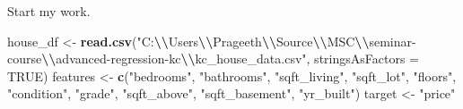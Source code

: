 \documentclass[
  ignorenonframetext,
]{beamer}
\newenvironment{Shaded}{\begin{snugshade}}{\end{snugshade}}
\newcommand{\AttributeTok}[1]{\textcolor[rgb]{0.13,0.29,0.53}{#1}}
\newcommand{\ConstantTok}[1]{\textcolor[rgb]{0.56,0.35,0.01}{#1}}
\newcommand{\FunctionTok}[1]{\textcolor[rgb]{0.13,0.29,0.53}{\textbf{#1}}}
\newcommand{\NormalTok}[1]{#1}
\newcommand{\OtherTok}[1]{\textcolor[rgb]{0.56,0.35,0.01}{#1}}
\newcommand{\SpecialCharTok}[1]{\textcolor[rgb]{0.81,0.36,0.00}{\textbf{#1}}}
\newcommand{\StringTok}[1]{\textcolor[rgb]{0.31,0.60,0.02}{#1}}
\begin{document}
\begin{frame}[fragile]{Start my work.}
\label{start-my-work.}
\begin{block}{}
\label{section-1}
\begin{Shaded}
\begin{Highlighting}[]
\NormalTok{house\_df }\OtherTok{\textless{}{-}} \FunctionTok{read.csv}\NormalTok{(}\StringTok{"C:}\SpecialCharTok{\textbackslash{}\textbackslash{}}\StringTok{Users}\SpecialCharTok{\textbackslash{}\textbackslash{}}\StringTok{Prageeth}\SpecialCharTok{\textbackslash{}\textbackslash{}}\StringTok{Source}\SpecialCharTok{\textbackslash{}\textbackslash{}}\StringTok{MSC}\SpecialCharTok{\textbackslash{}\textbackslash{}}\StringTok{seminar{-}course}\SpecialCharTok{\textbackslash{}\textbackslash{}}\StringTok{advanced{-}regression{-}kc}\SpecialCharTok{\textbackslash{}\textbackslash{}}\StringTok{kc\_house\_data.csv"}\NormalTok{, }\AttributeTok{stringsAsFactors =} \ConstantTok{TRUE}\NormalTok{)}
\NormalTok{features }\OtherTok{\textless{}{-}} \FunctionTok{c}\NormalTok{(}\StringTok{"bedrooms"}\NormalTok{, }\StringTok{"bathrooms"}\NormalTok{, }\StringTok{"sqft\_living"}\NormalTok{, }\StringTok{"sqft\_lot"}\NormalTok{, }\StringTok{"floors"}\NormalTok{, }
              \StringTok{"condition"}\NormalTok{, }\StringTok{"grade"}\NormalTok{, }\StringTok{"sqft\_above"}\NormalTok{, }\StringTok{"sqft\_basement"}\NormalTok{, }\StringTok{"yr\_built"}\NormalTok{)}
\NormalTok{target }\OtherTok{\textless{}{-}} \StringTok{"price"}
\end{Highlighting}
\end{Shaded}
\end{block}
\end{frame}
\end{document}
